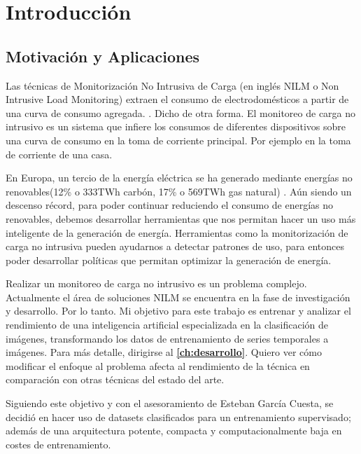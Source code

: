 
\chapter{Introducción}
\label{ch:intro}

\section{Motivación y Aplicaciones}
\label{sec:motivacionyaplicaciones}

Las técnicas de Monitorización No Intrusiva de Carga (en inglés NILM o Non Intrusive Load Monitoring) extraen el consumo de electrodomésticos a partir de una curva de consumo agregada. \autocite[1]{NILMreview}. Dicho de otra forma. El monitoreo de carga no intrusivo es un sistema que infiere los consumos de diferentes dispositivos sobre una curva de consumo en la toma de corriente principal. Por ejemplo en la toma de corriente de una casa.

En Europa, un tercio de la energía eléctrica se ha generado mediante energías no renovables(12\% o 333TWh carbón, 17\% o 569TWh gas natural)\autocite{energyeurope} \autocite{ember2024european}. Aún siendo un descenso récord, para poder continuar reduciendo el consumo de energías no renovables, debemos desarrollar herramientas que nos permitan hacer un uso más inteligente de la generación de energía. Herramientas como la monitorización de carga no intrusiva pueden ayudarnos a detectar patrones de uso\autocite[11]{nilmstateoftheart}, para entonces poder desarrollar políticas que permitan optimizar la generación de energía. 


Realizar un monitoreo de carga no intrusivo es un problema complejo. Actualmente el área de soluciones NILM se encuentra en la fase de investigación y desarrollo. Por lo tanto. Mi objetivo para este trabajo es entrenar y analizar el rendimiento de una inteligencia artificial especializada en la clasificación de imágenes, transformando los datos de entrenamiento de series temporales a imágenes. Para más detalle, dirigirse al \textbf{\autoref{ch:desarrollo}}. Quiero ver cómo modificar el enfoque al problema afecta al rendimiento de la técnica en comparación con otras técnicas del estado del arte. 

Siguiendo este objetivo y con el asesoramiento de Esteban García Cuesta, se decidió en hacer uso de datasets clasificados para un entrenamiento supervisado; además de una arquitectura potente, compacta y computacionalmente baja en costes de entrenamiento. 

